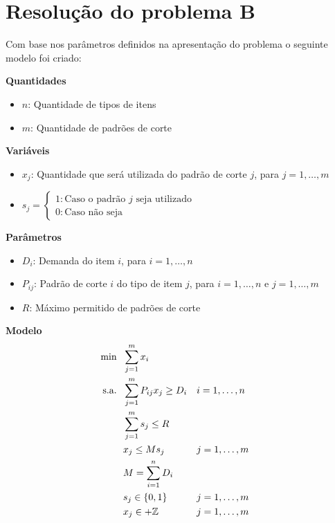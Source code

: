 \documentclass[12pt]{article}
\begin{document}
\newpage

\section{Resolução do problema B} %
Com base nos parâmetros definidos na apresentação do problema o seguinte modelo foi criado:

\textbf{Quantidades}
\begin{itemize}
    \item $n$: Quantidade de tipos de itens
    \item $m$: Quantidade de padrões de corte
\end{itemize}

\textbf{Variáveis}
\begin{itemize}
    \item $x_j$: Quantidade que será utilizada do padrão de corte $j$, para $j = 1,\ldots, m$  
    \item $s_j = 
        \begin{cases}
            1 : \text{Caso o padrão } j \text{ seja utilizado} \\
            0 : \text{Caso não seja}
        \end{cases}
    $
\end{itemize}

\textbf{Parâmetros}
\begin{itemize}
    \item $D_i$: Demanda do item $i$, para $i = 1,\ldots, n$  
    \item $P_{ij}$: Padrão de corte $i$ do tipo de item $j$, para $i = 1,\ldots,n$ e $j = 1,\ldots,m$  
    \item $R$: Máximo permitido de padrões de corte  
\end{itemize}

\textbf{Modelo}
\begin{align*}
    \hbox{min} \ \ 
        & \sum_{j=1}^m x_i \\
    \hbox{s.a.} \ \ 
        & \sum_{j=1}^m P_{ij} x_j \geq D_i && i = 1, \ldots, n \\
        & \sum_{j=1}^m s_j \leq R                              \\
        & x_j \leq M s_j                   && j = 1, \ldots, m \\
        & M = \sum_{i=1}^n D_i                                 \\
        & s_j \in \{0, 1\}                 && j = 1, \ldots, m \\
        & x_{j} \in +\mathbb{Z}            && j = 1, \ldots, m \\
\end{align*}
\end{document}
